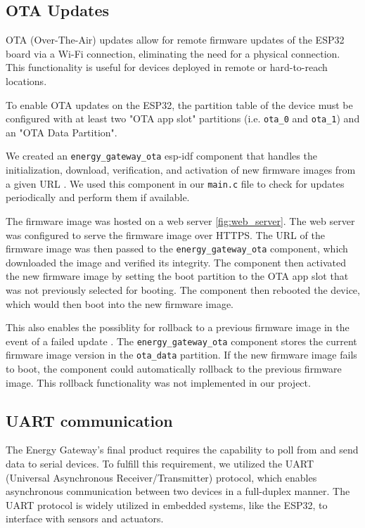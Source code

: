 \subsection{OTA Updates}

OTA (Over-The-Air) updates allow for remote firmware updates of the ESP32 board via a Wi-Fi connection, eliminating the need for a physical connection. This functionality is useful for devices deployed in remote or hard-to-reach locations.

To enable OTA updates on the ESP32, the partition table of the device must be configured with at least two "OTA app slot" partitions (i.e. \texttt{ota\_0} and \texttt{ota\_1}) and an "OTA Data Partition". 

We created an \texttt{energy\_gateway\_ota} esp-idf component that handles the initialization, download, verification, and activation of new firmware images from a given URL \cite{energy-gateway:github}. We used this component in our \texttt{main.c} file to check for updates periodically and perform them if available.

The firmware image was hosted on a web server \ref{fig:web_server}. The web server was configured to serve the firmware image over HTTPS. The URL of the firmware image was then passed to the \texttt{energy\_gateway\_ota} component, which downloaded the image and verified its integrity. The component then activated the new firmware image by setting the boot partition to the OTA app slot that was not previously selected for booting. The component then rebooted the device, which would then boot into the new firmware image.

This also enables the possiblity for rollback to a previous firmware image in the event of a failed update \cite{espressif:esp-idf-programming-guide}. The \texttt{energy\_gateway\_ota} component stores the current firmware image version in the \texttt{ota\_data} partition. If the new firmware image fails to boot, the component could automatically rollback to the previous firmware image. This rollback functionality was not implemented in our project.

\subsection{UART communication}

The Energy Gateway's final product requires the capability to poll from and send data to serial devices. To fulfill this requirement, we utilized the UART (Universal Asynchronous Receiver/Transmitter) protocol, which enables asynchronous communication between two devices in a full-duplex manner. The UART protocol is widely utilized in embedded systems, like the ESP32, to interface with sensors and actuators.

